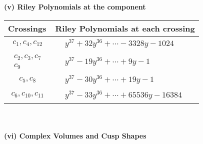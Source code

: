 \documentclass[1p]{elsarticle_modified}
\theoremstyle{definition}
\begin{document}
\newpage\renewcommand{\arraystretch}{1}
\flushleft \textbf{(v) Riley Polynomials at the component}\newline \\
\begin{tabular}{m{50pt}|m{274pt}}
Crossings & \hspace{64pt}Riley Polynomials at each crossing \\
\hline $$\begin{aligned}c_{1},c_{4},c_{12}\end{aligned}$$&$\begin{aligned}
&y^{37}+32 y^{36}+\cdots-3328 y-1024
\end{aligned}$\\
\hline $$\begin{aligned}c_{2},c_{3},c_{7}\\c_{9}\end{aligned}$$&$\begin{aligned}
&y^{37}-19 y^{36}+\cdots+9 y-1
\end{aligned}$\\
\hline $$\begin{aligned}c_{5},c_{8}\end{aligned}$$&$\begin{aligned}
&y^{37}-30 y^{36}+\cdots+19 y-1
\end{aligned}$\\
\hline $$\begin{aligned}c_{6},c_{10},c_{11}\end{aligned}$$&$\begin{aligned}
&y^{37}-33 y^{36}+\cdots+65536 y-16384
\end{aligned}$\\
\hline
\end{tabular}\\~\\
\newpage\flushleft \textbf{(vi) Complex Volumes and Cusp Shapes}
\end{document}
